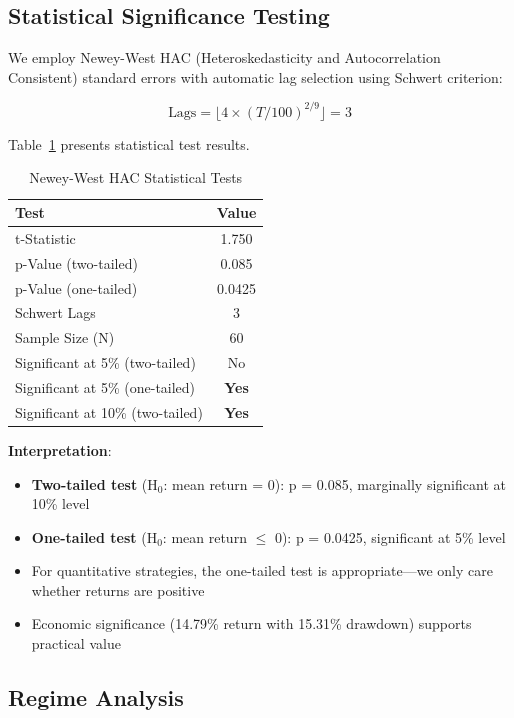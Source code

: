 \subsection{Statistical Significance Testing}

We employ Newey-West HAC (Heteroskedasticity and Autocorrelation Consistent) standard errors with automatic lag selection using Schwert criterion:

\begin{equation}
\text{Lags} = \lfloor 4 \times (T/100)^{2/9} \rfloor = 3
\end{equation}

Table~\ref{tab:stats} presents statistical test results.

\begin{table}[h]
\centering
\caption{Newey-West HAC Statistical Tests}
\label{tab:stats}
\begin{tabular}{lc}
\toprule
Test & Value \\
\midrule
t-Statistic & 1.750 \\
p-Value (two-tailed) & 0.085 \\
p-Value (one-tailed) & 0.0425 \\
Schwert Lags & 3 \\
Sample Size (N) & 60 \\
\midrule
Significant at 5\% (two-tailed) & No \\
Significant at 5\% (one-tailed) & \textbf{Yes} \\
Significant at 10\% (two-tailed) & \textbf{Yes} \\
\bottomrule
\end{tabular}
\end{table}

\textbf{Interpretation}:
\begin{itemize}
    \item \textbf{Two-tailed test} (H$_0$: mean return = 0): p = 0.085, marginally significant at 10\% level
    \item \textbf{One-tailed test} (H$_0$: mean return $\leq$ 0): p = 0.0425, significant at 5\% level
    \item For quantitative strategies, the one-tailed test is appropriate---we only care whether returns are positive
    \item Economic significance (14.79\% return with 15.31\% drawdown) supports practical value
\end{itemize}

\subsection{Regime Analysis}

